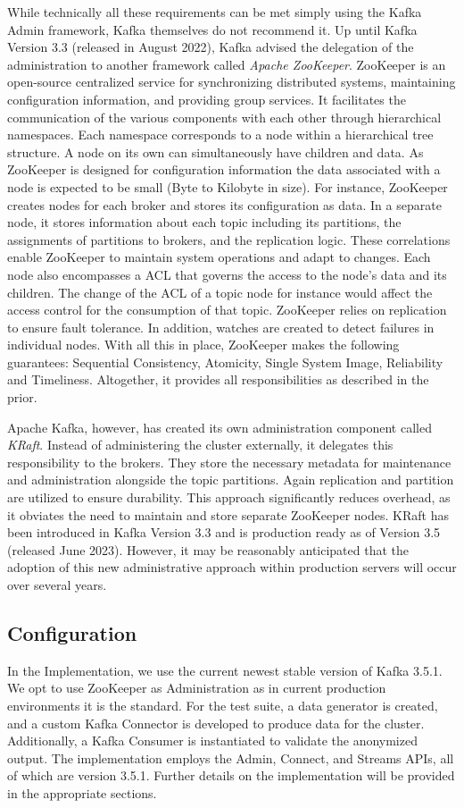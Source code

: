 While technically all these requirements can be met simply using the Kafka Admin framework, Kafka themselves do not recommend it. Up until Kafka Version 3.3 (released in August 2022), Kafka advised the delegation of the administration to another framework called \textit{Apache ZooKeeper}. ZooKeeper is an open-source centralized service for synchronizing distributed systems, maintaining configuration information, and providing group services. It facilitates the communication of the various components with each other through hierarchical namespaces. Each namespace corresponds to a node within a hierarchical tree structure. A node on its own can simultaneously have children and data. As ZooKeeper is designed for configuration information the data associated with a node is expected to be small (Byte to Kilobyte in size). For instance, ZooKeeper creates nodes for each broker and stores its configuration as data. In a separate node, it stores information about each topic including its partitions, the assignments of partitions to brokers, and the replication logic. These correlations enable ZooKeeper to maintain system operations and adapt to changes. Each node also encompasses a \ac{ACL} that governs the access to the node's data and its children. The change of the ACL of a topic node for instance would affect the access control for the consumption of that topic. ZooKeeper relies on replication to ensure fault tolerance. In addition, watches are created to detect failures in individual nodes. With all this in place, ZooKeeper makes the following guarantees: Sequential Consistency, Atomicity, Single System Image, Reliability and Timeliness. Altogether, it provides all responsibilities as described in the prior.\par
Apache Kafka, however, has created its own administration component called \textit{KRaft}. Instead of administering the cluster externally, it delegates this responsibility to the brokers. They store the necessary metadata for maintenance and administration alongside the topic partitions. Again replication and partition are utilized to ensure durability. This approach significantly reduces overhead, as it obviates the need to maintain and store separate ZooKeeper nodes. KRaft has been introduced in Kafka Version 3.3 and is production ready as of Version 3.5 (released June 2023). However, it may be reasonably anticipated that the adoption of this new administrative approach within production servers will occur over several years.

\subsection{Configuration}
In the Implementation, we use the current newest stable version of Kafka 3.5.1. We opt to use ZooKeeper as Administration as in current production environments it is the standard. For the test suite, a data generator is created, and a custom Kafka Connector is developed to produce data for the cluster. Additionally, a Kafka Consumer is instantiated to validate the anonymized output. The implementation employs the Admin, Connect, and Streams APIs, all of which are version 3.5.1. Further details on the implementation will be provided in the appropriate sections. 


